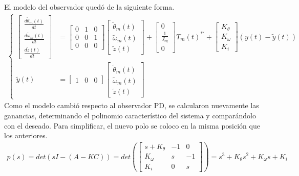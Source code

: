 \documentclass[a4paper, 10pt, onecolumn,journal]{ieeeconf}
\begin{document}
El modelo del observador quedó de la siguiente forma.
\begin{align}
	\begin{cases}
		\begin{bmatrix}
			\frac{d \tilde{\theta}_m(t)}{dt} \\ 
			\frac{d \tilde{\omega}_m(t)}{dt} \\
			\frac{d \tilde{z}(t)}{dt}
		\end{bmatrix} &= 
		\begin{bmatrix}
			0 & 1 & 0\\ 
			0 & 0 & 1 \\
			0 & 0 & 0
		\end{bmatrix}
		\begin{bmatrix}
			{\tilde{\theta}}_m(t) \\ 
			{\tilde{\omega}}_m(t) \\
			\tilde{z}(t)
		\end{bmatrix} + 
		\begin{bmatrix}
			0 \\ 
			\frac{1}{J_{eq}}\\
			0
		\end{bmatrix} {T_m(t)}^{*'} + 
		\begin{bmatrix}
			K_{\theta} \\
			K_{\omega}\\
			K_{i}
		\end{bmatrix} \left(y(t) - \tilde{y}(t) \right) \\
		\tilde{y}(t) &= \begin{bmatrix}
			1 & 0 & 0
		\end{bmatrix} 
		\begin{bmatrix}
			{\tilde{\theta}}_m(t) \\ 
			{\tilde{\omega}}_m(t) \\
			\tilde{z}(t)
		\end{bmatrix}
	\end{cases}\label{ecuacion matricial de observador nuevo}
\end{align}
Como el modelo cambió respecto al observador PD, se calcularon nuevamente las ganancias, determinando el polinomio característico del sistema y comparándolo con el deseado. Para simplificar, el nuevo polo se coloco en la misma posición que los anteriores.
\begin{align}
	p(s) = det\left(s I - \left( A - KC\right)  \right) = det\left(\begin{bmatrix}
		s + K_{\theta} & -1 & 0\\ 
		K_{\omega} & s & -1 \\
		K_{i} & 0 & s
	\end{bmatrix}  
	\right) = s^3 + K_{\theta} s^2 + K_{\omega} s + K_{i} \label{polinomeo caracteristico de observador nuevo}
\end{align}
\end{document}
